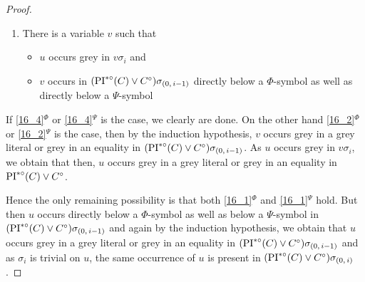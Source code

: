 \documentclass[,%
	draft=false,%
	numbers=noendperiod
	12pt,
	a4paper,
	oneside,%
	openany,
]{memoir}
\newcommand{\inv}{\ensuremath{\PIstarnosigma(C)\lor C\nosigma}}
\newcommand{\invp}{\ensuremath{(\inv)}}
\begin{document}
\begin{proof}
\begin{enumerate}
		\item 
			\label{16_2}
			There is a variable $v$ such that 
			{
				\renewcommand{\labelitemi}{\textendash}
				\begin{itemize}
					\item $u$ occurs grey in $v\sigma_i$ and
					\item $v$ occurs in $\invp\sigmazmi$ directly below a $\Phi$-symbol as well as directly below a $\Psi$-symbol
				\end{itemize}
			}
	\end{enumerate}

	If \ref{16_4}$^\Phi$ or \ref{16_4}$^\Psi$ is the case, we clearly are done.
	On the other hand \ref{16_2}$^\Phi$ or \ref{16_2}$^\Psi$ is the case, then by the induction hypothesis, $v$ occurs grey in a grey literal or grey in an equality in $\invp\sigmazmi$. 
	As $u$ occurs grey in $v\sigma_i$, we obtain that then, $u$ occurs grey in a grey literal or grey in an equality in $\inv$.

	Hence the only remaining possibility is that both \ref{16_1}$^\Phi$
	and \ref{16_1}$^\Psi$ hold.
	But then $u$ occurs directly below a $\Phi$-symbol as well as below a $\Psi$-symbol in $\invp\sigmazmi$ and again by the induction hypothesis, we obtain that $u$ occurs grey in a grey literal or grey in an equality in $\invp\sigmazmi$ and as $\sigma_i$ is trivial on $u$, the same occurrence of $u$ is present in $\invp\sigmazi$.
\end{proof}
\end{document}
